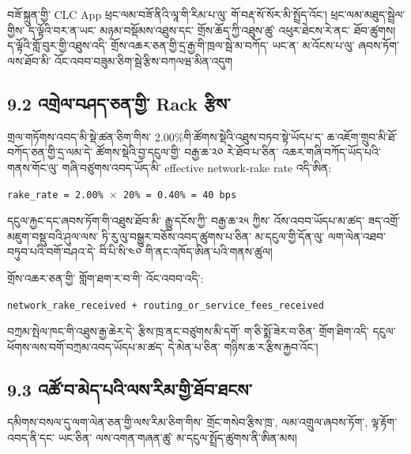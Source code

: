 \documentclass[11pt]{article}
\begin{document}
བཟོ་སྐྲུན་གྱི་ CLC App ཕྲང་ལམ་བཟོ་ནིའི་ལཱ་གི་རིམ་པ་ལུ་ གོ་བརྡ་སོ་སོར་མི་སྤྲོད་འོང་། ཕྲང་ལམ་མཐུད་སྦྲེལ་གྱིས་ ད་ལྟོའི་བར་ན་ཡང་ མཉམ་བསྡོམས་འཐུས་དང་ གྲོས་ཆོད་ཀྱི་འཐུས་ཚུ་ འཕུར་ཐེངས་རེ་ནང་ ཐོབ་ཚུགས། ད་ལྟོའི་གློ་བུར་གྱི་འཐུས་འདི་ གྲོས་འཆར་ཅན་གྱི་དྲ་རྒྱ་གི་ཁྲལ་སྦེ་མ་བཀོད་ ཡང་ན་ མ་འོངས་པ་ལུ་ ཞབས་ཏོག་ལས་ཐོབ་མི་ འོང་འབབ་བཟུམ་ཅིག་སྦེ་རྩིས་བཀལཝ་མིན་འདུག

\subsection*{9.2 འགྲེལ་བཤད་ཅན་གྱི་ Rack རྩིས་}

གྲལ་གཏོགས་འབད་མི་སྡེ་ཚན་ཅིག་གིས་ 2.00\%གི་ཚོགས་སྡེའི་འཐུས་བཏབ་སྟེ་ཡོདཔ་ད་ ཆ་འཇོག་གྲུབ་མི་ཐོ་བཀོད་ཅན་གྱི་དྲ་ལམ་དེ་ ཚོགས་སྡེའི་བྱ་དངུལ་གྱི་ བརྒྱ་ཆ་༢༠ རེ་ཐོབ་པ་ཅིན་ འཆར་གཞི་བཀོད་ཡོད་པའི་གནས་གོང་ལུ་ གཞི་བཙུགས་འབད་ཡོད་མི་ effective network-rake rate འདི་ཨིན:

\texttt{rake\_rate = 2.00\% $\times$ 20\% = 0.40\% = 40 bps}

དངུལ་རྐྱང་དང་ཞབས་ཏོག་གི་འཐུས་ཐོབ་མི་ རྒྱུ་དངོས་ཀྱི་ བརྒྱ་ཆ་༢༥ ཀྱིས་ འོས་འབབ་ཡོདཔ་མ་ཚད་ ཟད་འགྲོ་མཇུག་བསྡུ་བའི་ཤུལ་ལས་ ཏི་རུ་ལུ་བསྒྱུར་བཅོས་འབད་ཚུགས་པ་ཅིན་ མ་དངུལ་གྱི་དོན་ལུ་ ལག་ལེན་འཐབ་བཏུབ་པའི་བགོ་བཤའ་དེ་ བི་པི་སི་༤༠ གི་ནང་འཁོད་ཨིན་པའི་གནས་ཚུལ།

གྲོས་འཆར་ཅན་གྱི་ གློག་ཐག་ར་བ་གི་ འོང་འབབ་འདི་:

\texttt{network\_rake\_received + routing\_or\_service\_fees\_received}

བཀྲམ་སྤེལ་ཁང་གི་འཐུས་རྒྱ་ཆེར་དེ་ རྩིས་ཁྲ་ནང་བཙུགས་མི་དགོ་ ག་ཅི་སྨོ་ཟེར་བ་ཅིན་ གྲོག་ཐིག་འདི་ དངུལ་ཕོགས་ལས་བགོ་བཀྲམ་འབད་ཡོདཔ་མ་ཚད་ དེ་མེན་པ་ཅིན་ གཉིས་ཆ་ར་རྩིས་རྐྱབ་འོང་།

\subsection*{9.3 འཚོ་བ་མེད་པའི་ལས་རིམ་གྱི་ཐོབ་ཐངས་}

དམིགས་བསལ་དུ་ལག་ལེན་ཅན་གྱི་ལས་རིམ་ཅིག་གིས་ གྲོང་གསེབ་རྩིས་ཁྲ་, ལམ་འགྲུལ་ཞབས་ཏོག་, ལྟ་རྟོག་འབད་ནི་དང་ ཡང་ཅིན་ ལས་འགན་གཞན་ཚུ་ མ་དངུལ་སྤྲོད་ཚུགས་ནི་ཨིན་མས།
\end{document}
